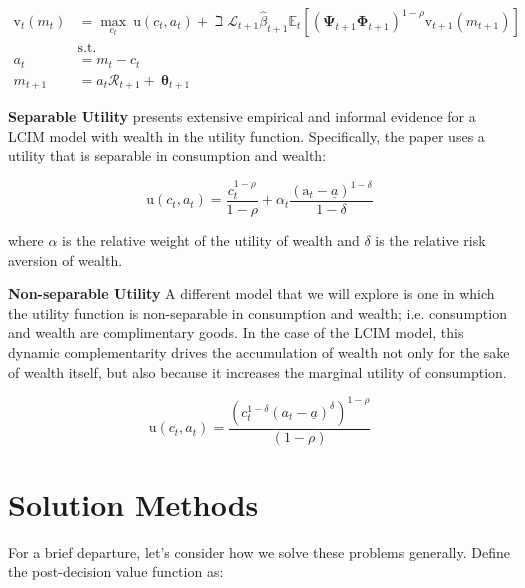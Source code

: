 \documentclass{article}
\newcommand{\DiscFac}{\beta}
\newcommand{\uFunc}{\mathrm{u}}
\newcommand{\vFunc}{\mathrm{v}}
\newcommand{\Alive}{\mathcal{L}}
\newcommand{\Ex}{\mathbb{E}}
\newcommand{\CRRA}{\rho}
\newcommand{\PermGroFac}{\pmb{\Phi}}
\newcommand{\PermShk}{\mathbf{\Psi}}
\newcommand{\aNrm}{a}
\newcommand{\cNrm}{c}
\newcommand{\RNrm}{\mathcal{R}}
\newcommand{\TranShkEmp}{\pmb{\theta}}
\newcommand{\aFunc}{\mathrm{a}}
\newcommand{\kapShare}{\alpha}
\newcommand{\wealthShare}{\delta}
\begin{document}
\begin{equation}
\begin{align}
    {\vFunc}_{t}({m}_{t}) & = \max_{\cNrm_{t}} ~ \uFunc(\cNrm_{t}, \aNrm_{t})+\beth\Alive_{t+1}\hat{\DiscFac}_{t+1}
    \Ex_{t}[(\PermShk_{t+1}\PermGroFac_{t+1})^{1-\CRRA}{\vFunc}_{t+1}({m}_{t+1})]
    \\ & \text{s.t.} & 
    \\ \aNrm_{t} & = {m}_{t}-\cNrm_{t} 
    \\ {m}_{t+1} & = \aNrm_{t}\RNrm_{t+1}+ ~\TranShkEmp_{t+1}
\end{align}
\end{equation}

\textbf{Separable Utility} \cite{Carroll_1998} presents extensive empirical and informal evidence for a LCIM model with wealth in the utility function. Specifically, the paper uses a utility that is separable in consumption and wealth:

\begin{equation}
\uFunc(\cNrm_{t}, \aNrm_{t}) = \frac{\cNrm_{t}^{1-\CRRA}}{1-\CRRA}
    + \kapShare_{t} \frac{(\aFunc_{t} - \underline\aNrm)^{1-\wealthShare}}{1-\wealthShare}
\end{equation}

where $\kapShare$ is the relative weight of the utility of wealth and $\wealthShare$ is the relative risk aversion of wealth.

\textbf{Non-separable Utility} A different model that we will explore is one in which the utility function is non-separable in consumption and wealth; i.e. consumption and wealth are complimentary goods. In the case of the LCIM model, this dynamic complementarity drives the accumulation of wealth not only for the sake of wealth itself, but also because it increases the marginal utility of consumption.

\begin{equation}
\uFunc(\cNrm_{t}, \aNrm_{t}) = \frac{(\cNrm_{t}^{1-\wealthShare} (\aNrm_{t} - \underline\aNrm)^\wealthShare)^{1-\CRRA}}{(1-\CRRA)}
\end{equation}

\section{Solution Methods}\label{Solution Methods}

For a brief departure, let's consider how we solve these problems generally. Define the post-decision value function as:
\end{document}
